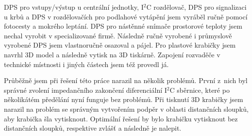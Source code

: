 DPS pro vstupy/výstup u centrální jednotky, I$^{2}$C rozdělovač, DPS pro signalizaci u krbů a DPS v rozdělovačích pro podlahové vytápění jsem vyráběl ručně pomocí fotocesty a mokrého leptání. DPS pro nástěnné snímače prostorové teploty jsem nechal vyrobit v specializované firmě. Následně ručně vyrobené i průmyslově vyrobené DPS jsem vlastnoručně osazoval a pájel. Pro plastové krabičky jsem navrhl 3D model a následně vytisk na 3D tiskárně. Zapojení rozvaděče v technické místnosti i jiných částech jsem též provedl já.

Průběžně jsem při řešení této práce narazil na několik problémů. První z~nich byl správné zvolení impedančního zakončení diferenciální I$^{2}$C sběrnice, které po několikátém předělání nyní funguje bez problémů. Při tisknutí 3D krabičky jsem narazil na problém se správným vytvořením podpěr v oblasti distančních sloupků, aby krabička šla vytisknout. Optimální řešení by bylo krabičku vytisknout bez distančních sloupků, respektive zvlášť a následně je nalepit.

